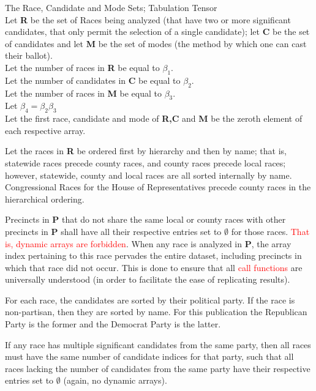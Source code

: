 \begin{definition}{The Race, Candidate and Mode Sets; Tabulation Tensor}\\
Let \textbf{R} be the set of Races being analyzed (that have two or more significant candidates, that only permit the selection of a single candidate); let \textbf{C} be the set of candidates and let \textbf{M} be the set of modes (the method by which one can cast their ballot).\\
Let the number of races in \textbf{R} be equal to $\beta_{1}$.\\
Let the number of candidates in \textbf{C} be equal to $\beta_{2}$.\\
Let the number of races in \textbf{M} be equal to $\beta_{3}$.\\
Let $\beta_{4}=\beta_{2}\beta_{3}$\\
Let the first race, candidate and mode of \textbf{R,C} and \textbf{M} be the zeroth element of each respective array.

Let the races in \textbf{R} be ordered first by hierarchy and then by name; that is, statewide races precede county races, and county races precede local races; however, statewide, county and local races are all sorted internally by name. Congressional Races for the House of Representatives precede county races in the hierarchical ordering.

Precincts in \textbf{P} that do not share the same local or county races with other precincts in \textbf{P} shall have all their respective entries set to $\emptyset$ for those races. \textcolor{red}{That is, dynamic arrays are forbidden}. When any race is analyzed in \textbf{P}, the array index pertaining to this race pervades the entire dataset, including precincts in which that race did not occur. This is done to ensure that all \textcolor{red}{call functions} are universally understood (in order to facilitate the ease of replicating results).

For each race, the candidates are sorted by their political party. If the race is non-partisan, then they are sorted by name. For this publication the Republican Party is the former and the Democrat Party is the latter.

If any race has multiple significant candidates from the same party, then all races must have the same number of candidate indices for that party, such that all races lacking the number of candidates from the same party have their respective entries set to $\emptyset$ (again, no dynamic arrays).


\end{definition}
